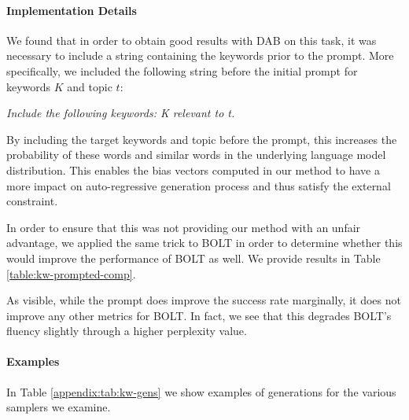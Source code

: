 \paragraph{Implementation Details}
We found that in order to obtain good results with DAB on this task, it was necessary to include a string containing the keywords prior to the prompt. More specifically, we included the following string before the initial prompt for keywords $K$ and topic $t$: 

\textit{Include the following keywords: K relevant to t.}

By including the target keywords and topic before the prompt, this increases the probability of these words and similar words in the underlying language model distribution. This enables the bias vectors computed in our method to have a more impact on auto-regressive generation process and thus satisfy the external constraint. 

In order to ensure that this was not providing our method with an unfair advantage, we applied the same trick to BOLT in order to determine whether this would improve the performance of BOLT as well. We provide results in Table \ref{table:kw-prompted-comp}. 


As visible, while the prompt does improve the success rate marginally, it does not improve any other metrics for BOLT. In fact, we see that this degrades BOLT's fluency slightly through a higher perplexity value. 
\paragraph{Examples} In Table \ref{appendix:tab:kw-gens} we show examples of generations for the various samplers we examine. 

